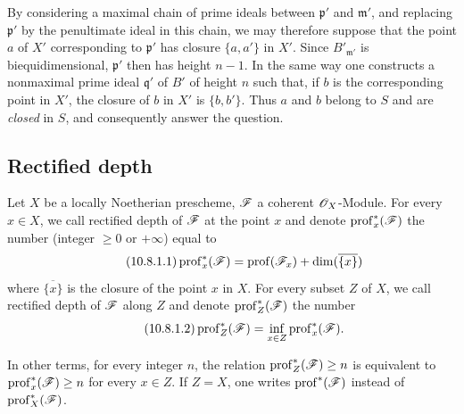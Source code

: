 \begin{env}[10.7.3]
By considering a maximal chain of prime ideals between $\mathfrak{p}'$ and $\mathfrak{m}'$, and replacing $\mathfrak{p}'$ by the penultimate ideal in this chain, we may therefore suppose that the point $a$ of $X'$ corresponding to $\mathfrak{p}'$ has closure $\{a,a'\}$ in $X'$.
Since $B'_{\mathfrak{m}'}$ is biequidimensional, $\mathfrak{p}'$ then has height $n-1$.
In the same way one constructs a nonmaximal prime ideal $\mathfrak{q}'$ of $B'$ of height $n$ such that, if $b$ is the corresponding point in $X'$, the closure of $b$ in $X'$ is $\{b,b'\}$.
Thus $a$ and $b$ belong to $S$ and are \emph{closed} in $S$, and consequently answer the question.
\end{env}

\subsection{Rectified depth}
\label{subsection:IV.10.8}

\begin{definition}[10.8.1]
\label{IV.10.8.1}
Let $X$ be a locally Noetherian prescheme, $\mathscr{F}$ a coherent $\mathscr{O}_X$-Module.
For every $x\in X$, we call rectified depth of $\mathscr{F}$ at the point $x$ and denote $\operatorname{prof}^*_x(\mathscr{F})$ the number (integer $\geq 0$ or $+\infty$) equal to
\begin{equation}
\label{IV.10.8.1.1}
\tag{10.8.1.1}
\operatorname{prof}^*_x(\mathscr{F})=\operatorname{prof}(\mathscr{F}_x)+\dim(\overline{\{x\}})
\end{equation}
where $\overline{\{x\}}$ is the closure of the point $x$ in $X$.
For every subset $Z$ of $X$, we call rectified depth of $\mathscr{F}$ along $Z$ and denote $\operatorname{prof}^*_Z(\mathscr{F})$ the number
\begin{equation}
\label{IV.10.8.1.2}
\tag{10.8.1.2}
\operatorname{prof}^*_Z(\mathscr{F})=\inf_{x\in Z}\operatorname{prof}^*_x(\mathscr{F}).
\end{equation}
\end{definition}

In other terms, for every integer $n$, the relation $\operatorname{prof}^*_Z(\mathscr{F})\geq n$ is equivalent to $\operatorname{prof}^*_x(\mathscr{F})\geq n$ for every $x\in Z$.
If $Z=X$, one writes $\operatorname{prof}^*(\mathscr{F})$ instead of $\operatorname{prof}^*_X(\mathscr{F})$.


